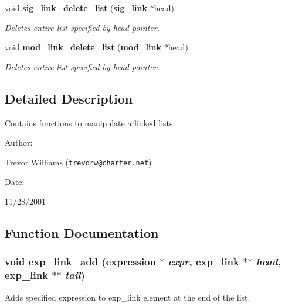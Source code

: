 \begin{CompactItemize}
void {\bf sig\_\-link\_\-delete\_\-list} ({\bf sig\_\-link} $\ast$head)
\begin{CompactList}\small\item\em Deletes entire list specified by head pointer.\item\end{CompactList}\item 
void {\bf mod\_\-link\_\-delete\_\-list} ({\bf mod\_\-link} $\ast$head)
\begin{CompactList}\small\item\em Deletes entire list specified by head pointer.\item\end{CompactList}\end{CompactItemize}


\subsection{Detailed Description}
Contains functions to manipulate a linked lists.



\begin{Desc}
\item[Author: ]\par
Trevor Williams ({\tt trevorw@charter.net}) \end{Desc}
\begin{Desc}
\item[Date: ]\par
11/28/2001\end{Desc}


\subsection{Function Documentation}
\subsubsection{\setlength{\rightskip}{0pt plus 5cm}void exp\_\-link\_\-add ({\bf expression} $\ast$ {\em expr}, {\bf exp\_\-link} $\ast$$\ast$ {\em head}, {\bf exp\_\-link} $\ast$$\ast$ {\em tail})}\label{link_8h_a2}


Adds specified expression to exp\_\-link element at the end of the list.

